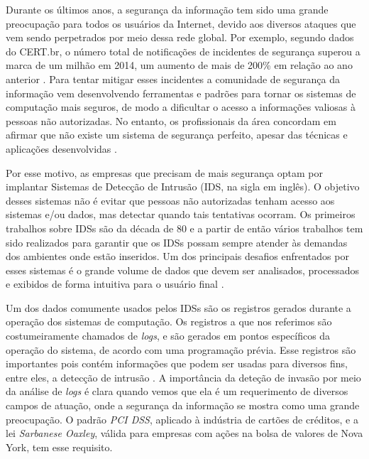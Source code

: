 \documentclass[
	12pt,				%
	openright,			%
	twoside,			%
	a4paper,			%
	english,			%
	spanish,			%
	brazil,				%
	]{abntex2}
\begin{document}
Durante os últimos anos, a segurança da informação tem sido uma grande preocupação para todos os usuários da Internet, devido aos diversos ataques que vem sendo perpetrados por meio dessa rede global. Por exemplo, segundo dados do CERT.br, o número total de notificações de incidentes de segurança superou a marca de um milhão em 2014, um aumento de mais de 200\% em relação ao ano anterior \cite{incidentes2015incidentes}. Para tentar mitigar esses incidentes a comunidade de segurança da informação vem desenvolvendo ferramentas e padrões para tornar os sistemas de computação mais seguros, de modo a dificultar o acesso a informações valiosas à pessoas não autorizadas. No entanto, os profissionais da área concordam em afirmar que não existe um sistema de segurança perfeito, apesar das técnicas e aplicações desenvolvidas \cite{dua2011data}.

Por esse motivo, as empresas que precisam de mais segurança optam por implantar Sistemas de Detecção de Intrusão (IDS, na sigla em inglês). O objetivo desses sistemas não é evitar que pessoas não autorizadas tenham acesso aos sistemas e/ou dados, mas detectar quando tais tentativas ocorram. Os primeiros trabalhos sobre IDSs são da década de 80 \cite{anderson1980computer, denning1987intrusion} e a partir de então vários trabalhos tem sido realizados para garantir que os IDSs possam sempre atender às demandas dos ambientes onde estão inseridos. Um dos principais desafios enfrentados por esses sistemas é o grande volume de dados que devem ser analisados, processados e exibidos de forma intuitiva para o usuário final \cite{big2013big, nassar2013secure}.


Um dos dados comumente usados pelos IDSs são os registros gerados durante a operação dos sistemas de computação. Os registros a que nos referimos são costumeiramente chamados de \emph{logs}, e são gerados em pontos específicos da operação do sistema, de acordo com uma programação prévia. Esse registros são importantes pois contém informações que podem ser usadas para diversos fins, entre eles, a detecção de intrusão \cite{jiang2008automated,oliner2012advances,nagappan2010abstracting}. A importância da deteção de invasão por meio da análise de \emph{logs} é clara quando vemos que ela é um requerimento de diversos campos de atuação, onde a segurança da informação se mostra como uma grande preocupação. O padrão \emph{PCI DSS}, aplicado à indústria de cartões de créditos, e a lei \emph{Sarbanese Oaxley}, válida para empresas com ações na bolsa de valores de Nova York, tem esse requisito.
\end{document}
